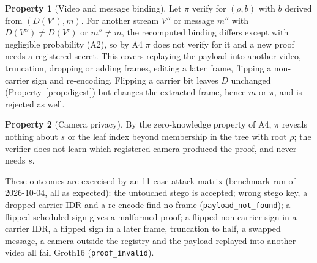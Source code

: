 \documentclass[11pt,a4paper]{article}
\theoremstyle{definition}
\newtheorem{property}{Property}
\theoremstyle{remark}
\begin{document}
\begin{property}[Video and message binding]
Let $\pi$ verify for $(\rho,b)$ with $b$ derived from $(D(V'),m)$. For another
stream $V''$ or message $m''$ with $D(V'')\ne D(V')$ or $m''\ne m$, the
recomputed binding differs except with negligible probability (A2), so by A4
$\pi$ does not verify for it and a new proof needs a registered secret. This
covers replaying the payload into another video, truncation, dropping or
adding frames, editing a later frame, flipping a non-carrier sign and
re-encoding. Flipping a carrier bit leaves $D$ unchanged
(Property~\ref{prop:digest}) but changes the extracted frame, hence $m$ or $\pi$,
and is rejected as well.
\end{property}

\begin{property}[Camera privacy]
By the zero-knowledge property of A4, $\pi$ reveals nothing about $s$ or the
leaf index beyond membership in the tree with root $\rho$; the verifier does
not learn which registered camera produced the proof, and never needs $s$.
\end{property}

These outcomes are exercised by an 11-case attack matrix (benchmark run of
2026-10-04, all as expected): the untouched stego is accepted; wrong stego
key, a dropped carrier IDR and a re-encode find no frame
(\texttt{payload\_not\_found}); a flipped scheduled sign gives a malformed
proof; a flipped non-carrier sign in a carrier IDR, a flipped sign in a later
frame, truncation to half, a swapped message, a camera outside the registry
and the payload replayed into another video all fail Groth16
(\texttt{proof\_invalid}).
\end{document}
